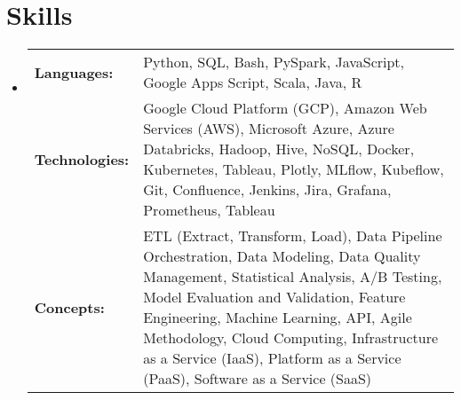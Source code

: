 \section{Skills}
\begin{itemize}[leftmargin=0.15in, rightmargin=0.15in,label={}]
    \small \item[]
    \begin{tabularx}{\linewidth}{@{}lX@{}}
        \textbf{Languages:}{\hspace{8pt}} & Python, SQL, Bash, PySpark, JavaScript, Google Apps Script, Scala, Java, R \\
        \textbf{Technologies:}{\hspace{8pt}} & Google Cloud Platform (GCP), Amazon Web Services (AWS), Microsoft Azure, Azure Databricks, Hadoop, Hive, NoSQL, Docker, Kubernetes, Tableau, Plotly, MLflow, Kubeflow, Git, Confluence, Jenkins, Jira, Grafana, Prometheus, Tableau \\
        \textbf{Concepts:}{\hspace{8pt}} & ETL (Extract, Transform, Load), Data Pipeline Orchestration, Data Modeling, Data Quality Management, Statistical Analysis, A/B Testing, Model Evaluation and Validation, Feature Engineering, Machine Learning, API, Agile Methodology, Cloud Computing, Infrastructure as a Service (IaaS), Platform as a Service (PaaS), Software as a Service (SaaS) \\
    \end{tabularx}
\end{itemize}